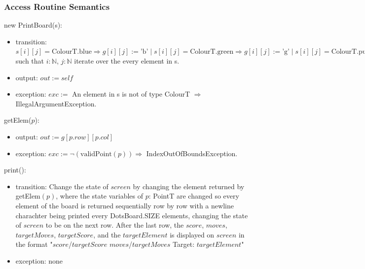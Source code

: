 \documentclass[12pt]{article}
\begin{document}
\subsubsection*{Access Routine Semantics}

new PrintBoard(s):

\begin{itemize}

\item transition: $s[i][j] = \mbox{ColourT.blue} \Rightarrow g[i][j] := \mbox{'b'} \mid s[i][j] = \mbox{ColourT.green} \Rightarrow g[i][j] := \mbox{'g'} \mid s[i][j] = \mbox{ColourT.purple} \Rightarrow g[i][j] := \mbox{'p'} \mid s[i][j] = \mbox{ColourT.orangle} \Rightarrow g[i][j] := \mbox{'o'} \mid s[i][j] = \mbox{ColourT.red} \Rightarrow g[i][j] := \mbox{'r'}$ such that $i:\mathbb{N}$, $j:\mathbb{N}$ iterate over the every element in s.

\item output: $out := self$

\item exception: $exc := $ An element in s is not of type ColourT $\Rightarrow$ IllegalArgumentException.

\end{itemize}

\noindent getElem($p$):

\begin{itemize}

\item output: $out := g[p.row][p.col]$

\item exception: $exc := \lnot (\mbox{validPoint}(p)) \Rightarrow$ IndexOutOfBoundsException.

\end{itemize}

\noindent print():

\begin{itemize}

\item transition: Change the state of $screen$ by changing the element returned by getElem$(p)$, where the state variables of $p$: PointT are changed so every element of the board is returned sequentially row by row with a newline charachter being printed every DotsBoard.SIZE elements, changing the state of $screen$ to be on the next row. After the last row, the $score$, $moves$, $targetMoves$, $targetScore$, and the $targetElement$ is displayed on $screen$ in the format "$score$/$targetScore$    $moves$/$targetMoves$	      Target: $targetElement$"

\item exception: none

\end{itemize}
\end{document}
